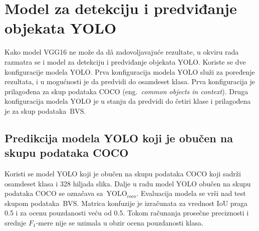 \documentclass[12pt,oneside]{memoir}
\newcommand{\yolo}{\ensuremath{\,\textrm{YOLO}}}
\newcommand{\bvs}{\ensuremath{\,\textrm{BVS}}}
\begin{document}
\section{Model za detekciju i predviđanje objekata YOLO}

Kako model VGG16 ne može da d\^{a} zadovoljavajuće rezultate, u okviru rada razmatra se i model za detekciju i predviđanje objekata YOLO. Koriste se dve konfiguracije modela YOLO. Prva konfiguracija modela YOLO služi za poređenje rezultata, i u mogućnosti je da predvidi do osamdeset klasa. Prva konfiguracija je prilagođena za skup podataka COCO (eng.~\textit{common objects in context}). Druga konfiguracija modela YOLO je u stanju da predvidi do četiri klase i prilagođena je za skup podataka \bvs.


\subsection{Predikcija modela YOLO koji je obučen na skupu podataka COCO}

Koristi se model YOLO koji je obučen na skupu podataka COCO koji sadrži osamdeset klasa i 328 hiljada slika. Dalje u radu model YOLO obučen na skupu podataka COCO se označava sa $\yolo_{coco}$. Evaluacija modela se vrši nad test skupom podataka \bvs. Matrica konfuzije je izračunata za vrednost IoU praga 0.5 i za ocenu pouzdanosti veću od 0.5. Tokom računanja prosečne preciznosti i srednje $F_1$-mere nije se uzimala u obzir ocena pouzdanosti klasa. 
\end{document}
